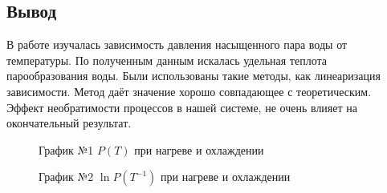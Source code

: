 \documentclass[a4paper, 12pt]{article}
\begin{document}
\begin{center}
	\subsection*{Вывод}
\end{center}
	
В работе изучалась зависимость давления насыщенного пара воды от температуры. По полученным данным искалась удельная теплота парообразования воды. Были использованы такие методы, как линеаризация зависимости. Метод даёт значение хорошо совпадающее с теоретическим. Эффект необратимости процессов в нашей системе, не очень влияет на окончательный результат.

\newpage

\begin{figure}[h]
	\caption[]{\label{fig:2} График №1 $P(T)$ при нагреве и охлаждении}
\end{figure}

\begin{figure}[h]
	\caption[]{\label{fig:3} График №2 $\ln P(T^{-1})$ при нагреве и охлаждении}
\end{figure}
\end{document}
